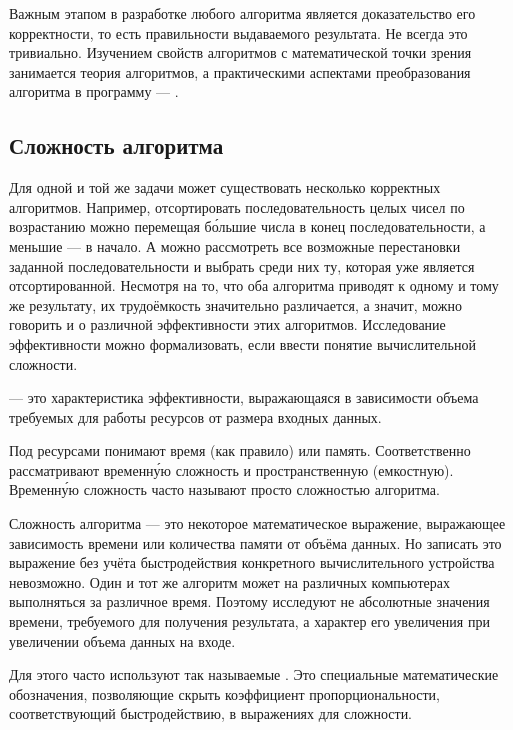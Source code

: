 Важным этапом в разработке любого алгоритма является доказательство
его корректности, то есть правильности выдаваемого результата. Не
всегда это тривиально. Изучением свойств алгоритмов с математической
точки зрения занимается теория алгоритмов, а практическими аспектами
преобразования алгоритма в программу — .

\subsection{Сложность алгоритма}

Для одной и той же задачи может существовать несколько корректных
алгоритмов. Например, отсортировать последовательность целых чисел по
возрастанию можно перемещая бо́льшие числа в конец последовательности,
а меньшие — в начало. А можно рассмотреть все возможные перестановки
заданной последовательности и выбрать среди них ту, которая уже
является отсортированной. Несмотря на то, что оба алгоритма приводят к
одному и тому же результату, их трудоёмкость значительно различается,
а значит, можно говорить и о различной эффективности этих
алгоритмов. Исследование эффективности можно формализовать, если
ввести понятие вычислительной сложности.

\begin{defn}
   — это
  характеристика эффективности, выражающаяся в зависимости объема
  требуемых для работы ресурсов от размера входных данных.
\end{defn}

Под ресурсами понимают время (как правило) или память. Соответственно
рассматривают временну́ю сложность и пространственную (емкостную).
Временну́ю сложность часто называют просто сложностью алгоритма.

Сложность алгоритма — это некоторое математическое выражение,
выражающее зависимость времени или количества памяти от объёма
данных. Но записать это выражение без учёта быстродействия конкретного
вычислительного устройства невозможно.  Один и тот же алгоритм может
на различных компьютерах выполняться за различное время. Поэтому
исследуют не абсолютные значения времени, требуемого для получения
результата, а характер его увеличения при увеличении объема данных на
входе.

Для этого часто используют так называемые . Это специальные математические обозначения,
позволяющие скрыть коэффициент пропорциональности, соответствующий
быстродействию, в выражениях для сложности.

